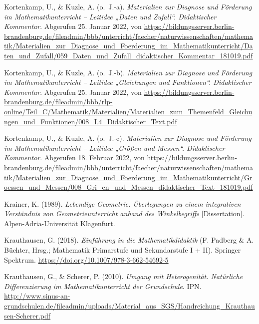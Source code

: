 \documentclass[
]{scrbook}
\newlength{\cslhangindent}
\newlength{\cslentryspacingunit} %
\newenvironment{CSLReferences}[2] %
 {%
  \setlength{\parindent}{0pt}
  \ifodd #1
  \let\oldpar\par
  \def\par{\hangindent=\cslhangindent\oldpar}
  \fi
  \setlength{\parskip}{#2\cslentryspacingunit}
 }%
 {}
\theoremstyle{definition}
\theoremstyle{definition}
\theoremstyle{definition}
\theoremstyle{definition}
\theoremstyle{remark}
\begin{document}
\begin{CSLReferences}{1}{0}
\leavevmode{}%
Kortenkamp, U., \& Kuzle, A. (o.~J.-a). \emph{Materialien zur {Diagnose} und {Förderung} im {Mathematikunterricht} -- {Leitidee} „{Daten} und {Zufall}``. {Didaktischer} {Kommentar}}. Abgerufen 25. Januar 2022, von \url{https://bildungsserver.berlin-brandenburg.de/fileadmin/bbb/unterricht/faecher/naturwissenschaften/mathematik/Materialien_zur_Diagnose_und_Foerderung_im_Mathematikunterricht/Daten_und_Zufall/059_Daten_und_Zufall_didaktischer_Kommentar_181019.pdf}

\leavevmode{}%
Kortenkamp, U., \& Kuzle, A. (o.~J.-b). \emph{Materialien zur {Diagnose} und {Förderung} im {Mathematikunterricht} -- {Leitidee} „{Gleichungen} und {Funktionen}``. {Didaktischer} {Kommentar}}. Abgerufen 25. Januar 2022, von \url{https://bildungsserver.berlin-brandenburg.de/fileadmin/bbb/rlp-online/Teil_C/Mathematik/Materialien/Materialien_zum_Themenfeld_Gleichungen_und_Funktionen/008_L4_Didaktischer_Text.pdf}

\leavevmode{}%
Kortenkamp, U., \& Kuzle, A. (o.~J.-c). \emph{Materialien zur {Diagnose} und {Förderung} im {Mathematikunterricht} -- {Leitidee} „{Größen} und {Messen}``. {Didaktischer} {Kommentar}}. Abgerufen 18. Februar 2022, von \url{https://bildungsserver.berlin-brandenburg.de/fileadmin/bbb/unterricht/faecher/naturwissenschaften/mathematik/Materialien_zur_Diagnose_und_Foerderung_im_Mathematikunterricht/Groessen_und_Messen/008_Gri_en_und_Messen_didaktischer_Text_181019.pdf}

\leavevmode{}%
Krainer, K. (1989). \emph{Lebendige {Geometrie}. Überlegungen zu einem integrativen {Verständnis} von {Geometrieunterricht} anhand des {Winkelbegriffs}} {[}Dissertation{]}. Alpen-Adria-Universität Klagenfurt.

\leavevmode{}%
Krauthausen, G. (2018). \emph{Einführung in die {Mathematikdidaktik}} (F. Padberg \& A. Büchter, Hrsg.; Mathematik Primarstufe und Sekundarstufe I + II). Springer Spektrum. \url{https://doi.org/10.1007/978-3-662-54692-5}

\leavevmode{}%
Krauthausen, G., \& Scherer, P. (2010). \emph{Umgang mit {Heterogenität}. {Natürliche} {Differenzierung} im {Mathematikunterricht} der {Grundschule}}. IPN. \url{http://www.sinus-an-grundschulen.de/fileadmin/uploads/Material_aus_SGS/Handreichung_Krauthausen-Scherer.pdf}


\end{CSLReferences}
\end{document}
